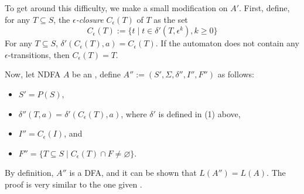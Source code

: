 \documentclass[12pt]{article}
\begin{document}
To get around this difficulty, we make a small modification on $A'$.  First, define, for any $T\subseteq S$, the \emph{$\epsilon$-closure} $C_{\epsilon}(T)$ of $T$ as the set 
\begin{equation}
C_{\epsilon}(T):=\lbrace t \mid t \in \delta'(T,\epsilon^k), k\ge 0 \rbrace
\end{equation}
For any $T\subseteq S$, $\delta'(C_{\epsilon}(T),a)=C_{\epsilon}(T)$.  If the automaton does not contain any $\epsilon$-transitions, then $C_{\epsilon}(T)=T$.

Now, let NDFA $A$ be an , define $A'':=(S',\Sigma,\delta'',I'',F'')$ as follows:
\begin{itemize}
\item $S'=P(S)$,
\item $\delta''(T,a)= \delta'(C_{\epsilon}(T),a)$, where $\delta'$ is defined in (1) above,
\item $I''=C_{\epsilon}(I)$, and
\item $F''=\lbrace T\subseteq S\mid C_{\epsilon}(T)\cap F\ne \varnothing\rbrace$.
\end{itemize}
By definition, $A''$ is a DFA, and it can be shown that $L(A'')=L(A)$.  The proof is very similar to the one given .
\end{document}

